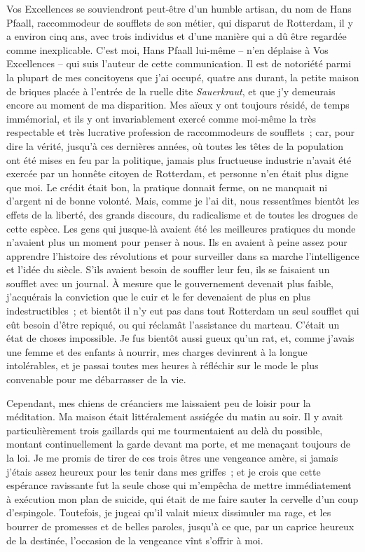 \documentclass[french,twoside]{book} %
\begin{document}
Vos Excellences se souviendront peut-être d’un humble artisan, du nom de Hans Pfaall, raccommodeur de soufflets de son métier, qui disparut de Rotterdam, il y a environ cinq ans, avec trois individus et d’une manière qui a dû être regardée comme inexplicable. C’est moi, Hans Pfaall lui-même – n’en déplaise à Vos Excellences – qui suis l’auteur de cette communication. Il est de notoriété parmi la plupart de mes concitoyens que j’ai occupé, quatre ans durant, la petite maison de briques placée à l’entrée de la ruelle dite \emph{Sauerkraut}, et que j’y demeurais encore au moment de ma disparition. Mes aïeux y ont toujours résidé, de temps immémorial, et ils y ont invariablement exercé comme moi-même la très respectable et très lucrative profession de raccommodeurs de soufflets ; car, pour dire la vérité, jusqu’à ces dernières années, où toutes les têtes de la population ont été mises en feu par la politique, jamais plus fructueuse industrie n’avait été exercée par un honnête citoyen de Rotterdam, et personne n’en était plus digne que moi. Le crédit était bon, la pratique donnait ferme, on ne manquait ni d’argent ni de bonne volonté. Mais, comme je l’ai dit, nous ressentîmes bientôt les effets de la liberté, des grands discours, du radicalisme et de toutes les drogues de cette espèce. Les gens qui jusque-là avaient été les meilleures pratiques du monde n’avaient plus un moment pour penser à nous. Ils en avaient à peine assez pour apprendre l’histoire des révolutions et pour surveiller dans sa marche l’intelligence et l’idée du siècle. S’ils avaient besoin de souffler leur feu, ils se faisaient un soufflet avec un journal. À mesure que le gouvernement devenait plus faible, j’acquérais la conviction que le cuir et le fer devenaient de plus en plus indestructibles ; et bientôt il n’y eut pas dans tout Rotterdam un seul soufflet qui eût besoin d’être repiqué, ou qui réclamât l’assistance du marteau. C’était un état de choses impossible. Je fus bientôt aussi gueux qu’un rat, et, comme j’avais une femme et des enfants à nourrir, mes charges devinrent à la longue intolérables, et je passai toutes mes heures à réfléchir sur le mode le plus convenable pour me débarrasser de la vie.\par
Cependant, mes chiens de créanciers me laissaient peu de loisir pour la méditation. Ma maison était littéralement assiégée du matin au soir. Il y avait particulièrement trois gaillards qui me tourmentaient au delà du possible, montant continuellement la garde devant ma porte, et me menaçant toujours de la loi. Je me promis de tirer de ces trois êtres une vengeance amère, si jamais j’étais assez heureux pour les tenir dans mes griffes ; et je crois que cette espérance ravissante fut la seule chose qui m’empêcha de mettre immédiatement à exécution mon plan de suicide, qui était de me faire sauter la cervelle d’un coup d’espingole. Toutefois, je jugeai qu’il valait mieux dissimuler ma rage, et les bourrer de promesses et de belles paroles, jusqu’à ce que, par un caprice heureux de la destinée, l’occasion de la vengeance vînt s’offrir à moi.\par
\end{document}
